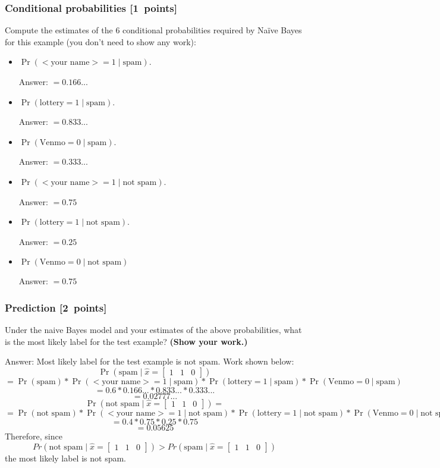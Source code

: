 \documentclass{article}
\newcommand{\blu}[1]{{\textcolor{blu}{#1}}}
\newcommand{\gre}[1]{\textcolor{gre}{#1}}
\newcommand\ans[1]{\par\gre{Answer: #1}}
\let\ask\blu
\newcommand\pts[1]{\textcolor{pointscolour}{[#1~points]}}
\begin{document}
    \subsubsection{Conditional probabilities \pts{1}}

    \ask{Compute the estimates of the 6 conditional probabilities required by Na\"ive Bayes for this example}  (you don't need to show any work):
    \begin{itemize}
        \item $\Pr(\text{$<$your name$>$} = 1  \mid \text{spam})$.
        \ans{$= 0.166...$}
        \item $\Pr(\text{lottery} = 1 \mid \text{spam})$.
        \ans{$= 0.833...$}
        \item $\Pr(\text{Venmo} = 0  \mid \text{spam})$.
        \ans{$= 0.333...$}
        \item $\Pr(\text{$<$your name$>$} = 1  \mid \text{not spam})$.
        \ans{$= 0.75$}
        \item $\Pr(\text{lottery} = 1  \mid \text{not spam})$.
        \ans{$= 0.25$}
        \item $\Pr(\text{Venmo} = 0  \mid \text{not spam})$
        \ans{$= 0.75$}
    \end{itemize}

    \subsubsection{Prediction \pts{2}}

    \ask{Under the naive Bayes model and your estimates of the above probabilities, what is the most likely label for the test example? \textbf{(Show your work.)}}
    
    \ans{Most likely label for the test example is $\text{not spam}$. Work shown below:
    \
    \[
    \Pr(\text{spam} \mid \hat{x} = \begin{bmatrix}1 & 1 & 0\end{bmatrix})
    \]
    \[
    = \Pr(\text{spam})*\Pr(\text{$<$your name$>$} = 1  \mid \text{spam})*\Pr(\text{lottery} = 1 \mid \text{spam})*\Pr(\text{Venmo} = 0  \mid \text{spam})
    \]
    \[
    = 0.6 * 0.166... * 0.833... * 0.333...
    \]
    \[
    = 0.02777...
    \]
    \newline
    \[
    \Pr(\text{not spam} \mid \hat{x} = \begin{bmatrix}1 & 1 & 0\end{bmatrix})=
    \]
    \[
    = \Pr(\text{not spam})*\Pr(\text{$<$your name$>$} = 1  \mid \text{not spam})*\Pr(\text{lottery} = 1 \mid \text{not spam})*\Pr(\text{Venmo} = 0  \mid \text{not spam})
    \]
    \[
    = 0.4 * 0.75 * 0.25 * 0.75
    \]
    \[
    = 0.05625
    \]
    \newline
    Therefore, since 
    \[
    Pr(\text{not spam} \mid \hat{x} = \begin{bmatrix}1 & 1 & 0\end{bmatrix}) > Pr(\text{spam} \mid \hat{x} = \begin{bmatrix}1 & 1 & 0\end{bmatrix})
    \] the most likely label is not spam.
    }
    \newpage
\end{document}
